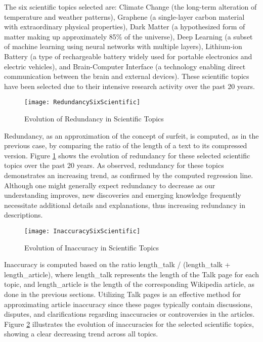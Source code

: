 The six scientific topics selected are: Climate Change (the long-term alteration of temperature and weather patterns), Graphene (a single-layer carbon material with extraordinary physical properties), Dark Matter (a hypothesized form of matter making up approximately 85\% of the universe), Deep Learning (a subset of machine learning using neural networks with multiple layers), Lithium-ion Battery (a type of rechargeable battery widely used for portable electronics and electric vehicles), and Brain-Computer Interface (a technology enabling direct communication between the brain and external devices). These scientific topics have been selected due to their intensive research activity over the past 20 years.

\begin{figure}[H]
\centering\texttt{[image: RedundancySixScientific]}
\caption{\label{fig:redundancy_six_scientific}Evolution of Redundancy in Scientific Topics}
\end{figure}

Redundancy, as an approximation of the concept of surfeit, is computed, as in the previous case, by comparing the ratio of the length of a text to its compressed version. Figure \ref{fig:redundancy_six_scientific} shows the evolution of redundancy for these selected scientific topics over the past 20 years. As observed, redundancy for these topics demonstrates an increasing trend, as confirmed by the computed regression line. Although one might generally expect redundancy to decrease as our understanding improves, new discoveries and emerging knowledge frequently necessitate additional details and explanations, thus increasing redundancy in descriptions.

\begin{figure}[H]
\centering\texttt{[image: InaccuracySixScientific]}
\caption{\label{fig:inaccuracy_six_scientific}Evolution of Inaccuracy in Scientific Topics}
\end{figure}

Inaccuracy is computed based on the ratio length\_talk / (length\_talk + length\_article), where length\_talk represents the length of the Talk page for each topic, and length\_article is the length of the corresponding Wikipedia article, as done in the previous sections. Utilizing Talk pages is an effective method for approximating article inaccuracy since these pages typically contain discussions, disputes, and clarifications regarding inaccuracies or controversies in the articles. Figure \ref{fig:inaccuracy_six_scientific} illustrates the evolution of inaccuracies for the selected scientific topics, showing a clear decreasing trend across all topics.

